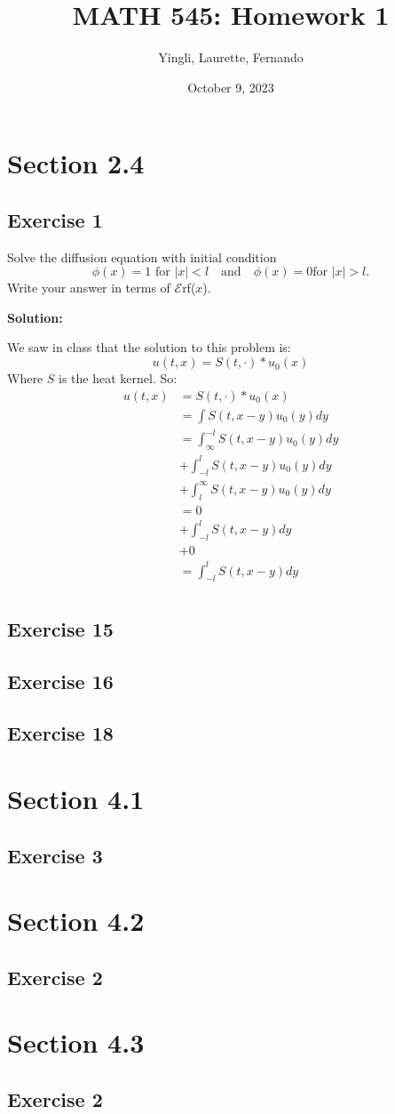\documentclass{article}
\title{MATH 545: Homework 1}
\author{Yingli, Laurette, Fernando}
\date{October 9, 2023}
\begin{document}
\maketitle
\section{Section 2.4}
\subsection{Exercise 1}
Solve the diffusion equation with initial condition
\[
\phi(x)=1\text{ for }|x|<l \quad \text{and} \quad \phi(x)=0 \text{
for } |x|>l.
\]
Write your answer in terms of $\mathscr{E}$rf($x$).

\textbf{Solution:}

We saw in class that the solution to this problem is:
\[
    u(t,x)=S(t,\cdot)\ast u_0(x)
\]
Where $S$ is the heat kernel. So:
\begin{align*}
    u(t,x)
    &=S(t,\cdot)\ast u_0(x)\\
    &=\int S(t,x-y)u_0(y)dy\\
    &=\int_{\infty}^{-l} S(t,x-y)u_0(y)dy\\
    &+ \int_{-l}^lS(t,x-y)u_0(y)dy\\
    &+ \int_l^{\infty}S(t,x-y)u_0(y)dy\\
    &=0\\
    &+\int_{-l}^lS(t,x-y)dy\\
    &+0\\
    &=\int_{-l}^lS(t,x-y)dy\\
\end{align*}
\subsection{Exercise 15}
\subsection{Exercise 16}
\subsection{Exercise 18}
\section{Section 4.1}
\subsection{Exercise 3}
\section{Section 4.2}
\subsection{Exercise 2}
\section{Section 4.3}
\subsection{Exercise 2}
\end{document}
